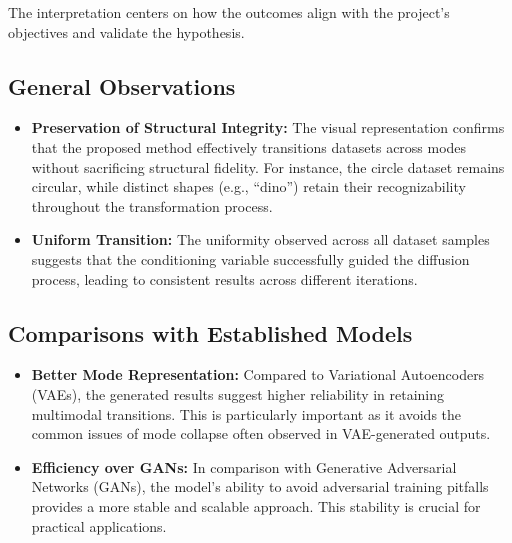The interpretation centers on how the outcomes align with the project's objectives and validate the hypothesis.
\subsection{General Observations}
\begin{itemize}
    \item \textbf{Preservation of Structural Integrity:} The visual representation confirms that the proposed method effectively transitions datasets across modes without sacrificing structural fidelity. For instance, the circle dataset remains circular, while distinct shapes (e.g., ``dino'') retain their recognizability throughout the transformation process.
    \item \textbf{Uniform Transition:} The uniformity observed across all dataset samples suggests that the conditioning variable successfully guided the diffusion process, leading to consistent results across different iterations.
\end{itemize}

\subsection{Comparisons with Established Models}
\begin{itemize}
    \item \textbf{Better Mode Representation:} Compared to Variational Autoencoders (VAEs), the generated results suggest higher reliability in retaining multimodal transitions. This is particularly important as it avoids the common issues of mode collapse often observed in VAE-generated outputs.
    \item \textbf{Efficiency over GANs:} In comparison with Generative Adversarial Networks (GANs), the model's ability to avoid adversarial training pitfalls provides a more stable and scalable approach. This stability is crucial for practical applications.
\end{itemize}

